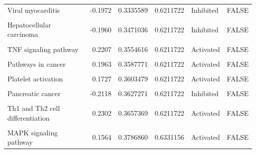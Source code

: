 \documentclass[9pt,a4paper,]{extarticle}
\begin{document}
\begin{table}
{\begin{tabular}[t]{lrrrll}
Viral myocarditis & -0.1972 & 0.3335589 & 0.6211722 & Inhibited & FALSE\\
\cellcolor{gray!6}{Salivary secretion} & \cellcolor{gray!6}{-0.1936} & \cellcolor{gray!6}{0.3378722} & \cellcolor{gray!6}{0.6211722} & \cellcolor{gray!6}{Inhibited} & \cellcolor{gray!6}{FALSE}\\
\addlinespace
Hepatocellular carcinoma & -0.1960 & 0.3471036 & 0.6211722 & Inhibited & FALSE\\
\cellcolor{gray!6}{NOD-like receptor signaling pathway} & \cellcolor{gray!6}{0.2062} & \cellcolor{gray!6}{0.3486674} & \cellcolor{gray!6}{0.6211722} & \cellcolor{gray!6}{Activated} & \cellcolor{gray!6}{FALSE}\\
TNF signaling pathway & 0.2207 & 0.3554616 & 0.6211722 & Activated & FALSE\\
\cellcolor{gray!6}{Antifolate resistance} & \cellcolor{gray!6}{0.1828} & \cellcolor{gray!6}{0.3583246} & \cellcolor{gray!6}{0.6211722} & \cellcolor{gray!6}{Activated} & \cellcolor{gray!6}{FALSE}\\
Pathways in cancer & 0.1963 & 0.3587771 & 0.6211722 & Activated & FALSE\\
\addlinespace
\cellcolor{gray!6}{Hepatitis C} & \cellcolor{gray!6}{-0.2073} & \cellcolor{gray!6}{0.3589089} & \cellcolor{gray!6}{0.6211722} & \cellcolor{gray!6}{Inhibited} & \cellcolor{gray!6}{FALSE}\\
Platelet activation & 0.1727 & 0.3603479 & 0.6211722 & Activated & FALSE\\
\cellcolor{gray!6}{Cholesterol metabolism} & \cellcolor{gray!6}{0.1952} & \cellcolor{gray!6}{0.3609333} & \cellcolor{gray!6}{0.6211722} & \cellcolor{gray!6}{Activated} & \cellcolor{gray!6}{FALSE}\\
Pancreatic cancer & -0.2118 & 0.3627271 & 0.6211722 & Inhibited & FALSE\\
\cellcolor{gray!6}{Tuberculosis} & \cellcolor{gray!6}{-0.1937} & \cellcolor{gray!6}{0.3637006} & \cellcolor{gray!6}{0.6211722} & \cellcolor{gray!6}{Inhibited} & \cellcolor{gray!6}{FALSE}\\
\addlinespace
Th1 and Th2 cell differentiation & 0.2302 & 0.3657369 & 0.6211722 & Activated & FALSE\\
\cellcolor{gray!6}{Cytosolic DNA-sensing pathway} & \cellcolor{gray!6}{-0.1837} & \cellcolor{gray!6}{0.3718124} & \cellcolor{gray!6}{0.6265186} & \cellcolor{gray!6}{Inhibited} & \cellcolor{gray!6}{FALSE}\\
MAPK signaling pathway & 0.1564 & 0.3786860 & 0.6331156 & Activated & FALSE\\

\end{tabular}}
\end{table}
\end{document}
